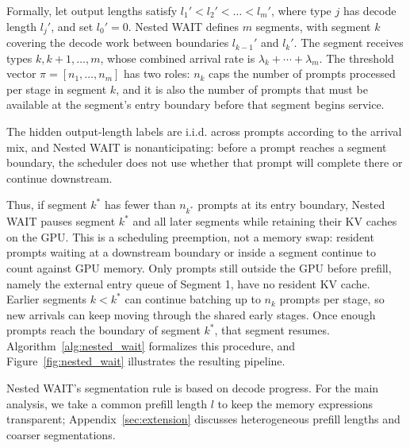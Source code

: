Formally, let output lengths satisfy $l_1' < l_2' < \dots < l_m'$, where type $j$ has decode length $l_j'$, and set $l_0'=0$. Nested WAIT defines \(m\) segments, with segment \(k\) covering the decode work between boundaries \(l_{k-1}'\) and \(l_k'\). The segment receives types \(k,k+1,\dots,m\), whose combined arrival rate is \(\lambda_k+\cdots+\lambda_m\). The threshold vector \(\pi=[n_1,\dots,n_m]\) has two roles: \(n_k\) caps the number of prompts processed per stage in segment \(k\), and it is also the number of prompts that must be available at the segment's entry boundary before that segment begins service.

The hidden output-length labels are i.i.d. across prompts according to the arrival mix, and Nested WAIT is nonanticipating: before a prompt reaches a segment boundary, the scheduler does not use whether that prompt will complete there or continue downstream.

Thus, if segment \(k^*\) has fewer than \(n_{k^*}\) prompts at its entry boundary, Nested WAIT pauses segment \(k^*\) and all later segments while retaining their KV caches on the GPU. This is a scheduling preemption, not a memory swap: resident prompts waiting at a downstream boundary or inside a segment continue to count against GPU memory. Only prompts still outside the GPU before prefill, namely the external entry queue of Segment 1, have no resident KV cache. Earlier segments \(k<k^*\) can continue batching up to \(n_k\) prompts per stage, so new arrivals can keep moving through the shared early stages. Once enough prompts reach the boundary of segment \(k^*\), that segment resumes. Algorithm~\ref{alg:nested_wait} formalizes this procedure, and Figure~\ref{fig:nested_wait} illustrates the resulting pipeline.

Nested WAIT's segmentation rule is based on decode progress. For the main analysis, we take a common prefill length \(l\) to keep the memory expressions transparent; Appendix~\ref{sec:extension} discusses heterogeneous prefill lengths and coarser segmentations.

